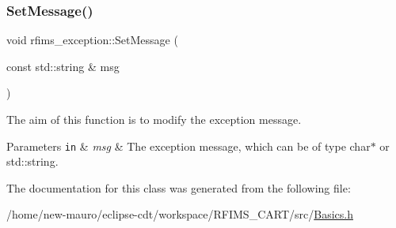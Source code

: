\subsubsection{\texorpdfstring{Set\+Message()}{SetMessage()}}
{\footnotesize\ttfamily void rfims\+\_\+exception\+::\+Set\+Message (\begin{DoxyParamCaption}\item[{const std\+::string \&}]{msg }\end{DoxyParamCaption})\hspace{0.3cm}{\ttfamily [inline]}}



The aim of this function is to modify the exception message. 


\begin{DoxyParams}[1]{Parameters}
\mbox{\tt in}  & {\em msg} & The exception message, which can be of type {\ttfamily char$\ast$} or {\ttfamily std\+::string}. \\
\hline
\end{DoxyParams}


The documentation for this class was generated from the following file\+:\begin{DoxyCompactItemize}
\item 
/home/new-\/mauro/eclipse-\/cdt/workspace/\+R\+F\+I\+M\+S\+\_\+\+C\+A\+R\+T/src/\hyperlink{Basics_8h}{Basics.\+h}\end{DoxyCompactItemize}
